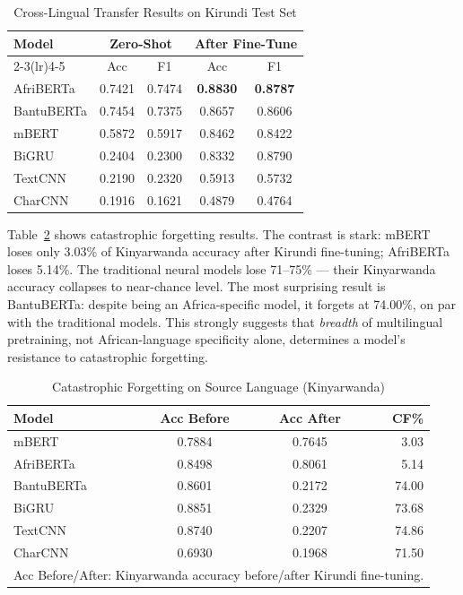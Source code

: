 \documentclass[conference]{IEEEtran}
\begin{document}
\begin{table}[htbp]
\caption{Cross-Lingual Transfer Results on Kirundi Test Set}
\label{tab:xlt}
\begin{center}
\small
\begin{tabular}{lcccc}
\toprule
\multirow{2}{*}{\textbf{Model}} &
\multicolumn{2}{c}{\textbf{Zero-Shot}} &
\multicolumn{2}{c}{\textbf{After Fine-Tune}} \\
\cmidrule(lr){2-3}\cmidrule(lr){4-5}
& Acc & F1 & Acc & F1 \\
\midrule
AfriBERTa  & 0.7421 & 0.7474 & \textbf{0.8830} & \textbf{0.8787} \\
BantuBERTa & 0.7454 & 0.7375 & 0.8657          & 0.8606          \\
mBERT      & 0.5872 & 0.5917 & 0.8462          & 0.8422          \\
\midrule
BiGRU      & 0.2404 & 0.2300 & 0.8332          & 0.8790          \\
TextCNN    & 0.2190 & 0.2320 & 0.5913          & 0.5732          \\
CharCNN    & 0.1916 & 0.1621 & 0.4879          & 0.4764          \\
\bottomrule
\end{tabular}
\end{center}
\end{table}

Table~\ref{tab:forgetting} shows catastrophic forgetting results.
The contrast is stark: mBERT loses only 3.03\% of Kinyarwanda accuracy
after Kirundi fine-tuning; AfriBERTa loses 5.14\%. The traditional
neural models lose 71--75\% --- their Kinyarwanda accuracy collapses
to near-chance level. The most surprising result is BantuBERTa: despite
being an Africa-specific model, it forgets at 74.00\%, on par with the
traditional models. This strongly suggests that \emph{breadth} of
multilingual pretraining, not African-language specificity alone,
determines a model's resistance to catastrophic forgetting.

\begin{table}[htbp]
\caption{Catastrophic Forgetting on Source Language (Kinyarwanda)}
\label{tab:forgetting}
\begin{center}
\begin{tabular}{lccr}
\toprule
\textbf{Model} & \textbf{Acc Before} & \textbf{Acc After} & \textbf{CF\%} \\
\midrule
mBERT          & 0.7884 & 0.7645 & \phantom{0}3.03 \\
AfriBERTa      & 0.8498 & 0.8061 & \phantom{0}5.14 \\
BantuBERTa     & 0.8601 & 0.2172 & 74.00 \\
\midrule
BiGRU          & 0.8851 & 0.2329 & 73.68 \\
TextCNN        & 0.8740 & 0.2207 & 74.86 \\
CharCNN        & 0.6930 & 0.1968 & 71.50 \\
\bottomrule
\multicolumn{4}{l}{\small Acc Before/After: Kinyarwanda accuracy before/after Kirundi fine-tuning.} \\
\end{tabular}
\end{center}
\end{table}
\end{document}
